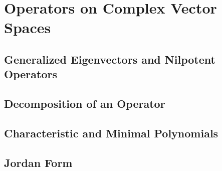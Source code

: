 \chapter{Operators on Complex Vector Spaces}

\section{\label{8.A} Generalized Eigenvectors and Nilpotent Operators}

\section{\label{8.B} Decomposition of an Operator}

\section{\label{8.C} Characteristic and Minimal Polynomials}

\section{\label{8.D} Jordan Form}